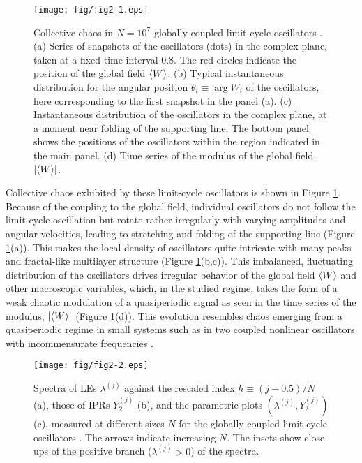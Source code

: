 \documentclass[12pt]{iopart}
\begin{document}
\begin{figure}[t]
 \begin{center}
  \texttt{[image: fig/fig2-1.eps]}
  \caption{Collective chaos in $N=10^7$ globally-coupled limit-cycle oscillators . (a) Series of snapshots of the oscillators (dots) in the complex plane, taken at a fixed time interval $0.8$. The red circles indicate the position of the global field $\langle W \rangle$. (b) Typical instantaneous distribution for the angular position $\theta_i \equiv \arg W_i$ of the oscillators, here corresponding to the first snapshot in the panel (a). (c) Instantaneous distribution of the oscillators in the complex plane, at a moment near folding of the supporting line. The bottom panel shows the positions of the oscillators within the region indicated in the main panel. (d) Time series of the modulus of the global field, $|\langle W \rangle|$.}
  \label{fig:2-1}
 \end{center}
\end{figure}%

Collective chaos exhibited by these limit-cycle oscillators is shown
 in Figure \ref{fig:2-1}.
Because of the coupling to the global field,
 individual oscillators do not follow the limit-cycle oscillation
 but rotate rather irregularly with varying amplitudes and angular velocities,
 leading to stretching and folding of the supporting line
 (Figure \ref{fig:2-1}(a)).
This makes the local density of oscillators quite intricate
 with many peaks and fractal-like multilayer structure
 (Figure \ref{fig:2-1}(b,c)).
This imbalanced, fluctuating distribution of the oscillators
 drives irregular behavior of the global field $\langle W \rangle$
 and other macroscopic variables,
 which, in the studied regime,
 takes the form of a weak chaotic modulation of a quasiperiodic signal
 as seen in the time series of the modulus, $|\langle W \rangle|$
 (Figure \ref{fig:2-1}(d)).
This evolution resembles chaos emerging from a quasiperiodic regime in small systems
such as in two coupled nonlinear oscillators
 with incommensurate frequencies \cite{Sano.Sawada-PLA1983}.

\begin{figure}[t]
 \begin{center}
  \texttt{[image: fig/fig2-2.eps]}
  \caption{Spectra of LEs $\lambda^{(j)}$ against the rescaled index $h \equiv (j-0.5)/N$ (a), those of IPRs $Y_2^{(j)}$ (b), and the parametric plots $(\lambda^{(j)},Y_2^{(j)})$ (c), measured at different sizes $N$ for the globally-coupled limit-cycle oscillators . The arrows indicate increasing $N$. The insets show close-ups of the positive branch ($\lambda^{(j)} > 0$) of the spectra.}
  \label{fig:2-2}
 \end{center}
\end{figure}%
\end{document}
